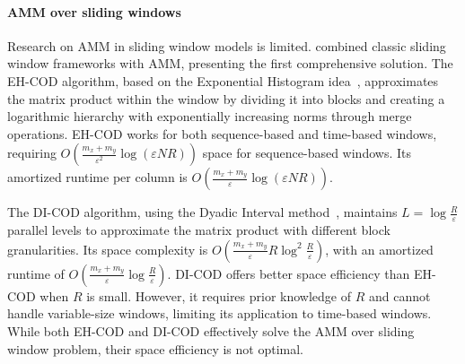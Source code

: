 \paragraph{AMM over sliding windows}
Research on AMM in sliding window models is limited. \citet{yao2024approximate} combined classic sliding window frameworks with AMM, presenting the first comprehensive solution. The EH-COD algorithm, based on the Exponential Histogram idea~\cite{datar2002maintaining}, approximates the matrix product within the window by dividing it into blocks and creating a logarithmic hierarchy with exponentially increasing norms through merge operations. EH-COD works for both sequence-based and time-based windows, requiring $O\left(\frac{m_x+m_y}{\varepsilon^2}\log{(\varepsilon NR)}\right)$ space for sequence-based windows. Its amortized runtime per column is $O\left(\frac{m_x+m_y}{\varepsilon}\log{(\varepsilon NR)}\right)$.

The DI-COD algorithm, using the Dyadic Interval method~\cite{arasu2004approximate}, maintains $L = \log{\frac{R}{\varepsilon}}$ parallel levels to approximate the matrix product with different block granularities. Its space complexity is $O\left(\frac{m_x+m_y}{\varepsilon}R\log^2{\frac{R}{\varepsilon}}\right)$, with an amortized runtime of $O\left(\frac{m_x+m_y}{\varepsilon}\log{\frac{R}{\varepsilon}}\right)$. DI-COD offers better space efficiency than EH-COD when $R$ is small. However, it requires prior knowledge of $R$ and cannot handle variable-size windows, limiting its application to time-based windows. While both EH-COD and DI-COD effectively solve the AMM over sliding window problem, their space efficiency is not optimal.

